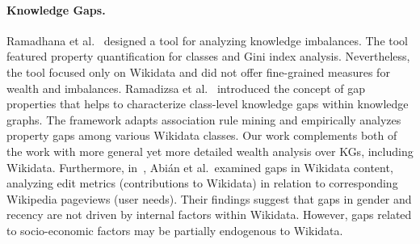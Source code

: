 \paragraph{Knowledge Gaps.} Ramadhana et al.~\cite{RamadhanaDPNRA20} designed a tool for analyzing knowledge imbalances.
The tool featured property quantification for classes and Gini index analysis.
Nevertheless, the tool focused only on Wikidata and did not offer fine-grained measures for wealth and imbalances.
Ramadizsa et al.~\cite{RamadizsaDNR23} introduced the concept of gap properties that helps to characterize class-level knowledge gaps within knowledge graphs.
The framework adapts association rule mining and empirically analyzes property gaps among various Wikidata classes.
Our work complements both of the work with more general yet more detailed wealth analysis over KGs, including Wikidata.
Furthermore, in~\cite{AbianMS22}, Abi{\'{a}}n et al.\ examined gaps in Wikidata content, analyzing edit metrics (contributions to Wikidata) in relation to corresponding Wikipedia pageviews (user needs). Their findings suggest that gaps in gender and recency are not driven by internal factors within Wikidata. However, gaps related to socio-economic factors may be partially endogenous to Wikidata.